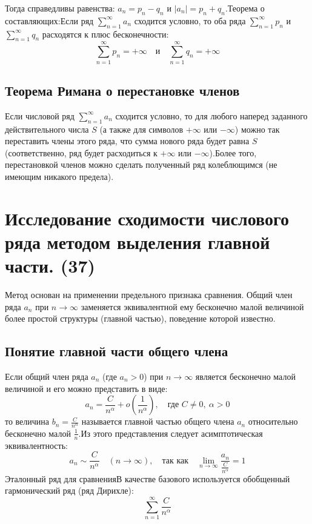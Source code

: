 \documentclass[14pt]{extreport}
\begin{document}
    Тогда справедливы равенства: $a_n = p_n - q_n$ и $|a_n| = p_n + q_n$.Теорема о составляющих:Если ряд $\sum_{n=1}^{\infty} a_n$ сходится условно, то оба ряда $\sum_{n=1}^{\infty} p_n$ и $\sum_{n=1}^{\infty} q_n$ расходятся к плюс бесконечности:$$\sum_{n=1}^{\infty} p_n = +\infty \quad \text{и} \quad \sum_{n=1}^{\infty} q_n = +\infty$$


    \section{Теорема Римана о перестановке членов}
    \begin{theorem}
        Если числовой ряд $\sum_{n=1}^{\infty} a_n$ сходится условно, то для любого наперед заданного действительного числа $S$ (а также для символов $+\infty$ или $-\infty$) можно так переставить члены этого ряда, что сумма нового ряда будет равна $S$ (соответственно, ряд будет расходиться к $+\infty$ или $-\infty$).Более того, перестановкой членов можно сделать полученный ряд колеблющимся (не имеющим никакого предела).
    \end{theorem}


    \chapter{Исследование сходимости числового ряда методом выделения главной части. (37)}

    Метод основан на применении предельного признака сравнения. Общий член ряда $a_n$ при $n \to \infty$ заменяется эквивалентной ему бесконечно малой величиной более простой структуры (главной частью), поведение которой известно.

    \section{Понятие главной части общего члена}
    Если общий член ряда $a_n$ (где $a_n > 0$) при $n \to \infty$ является бесконечно малой величиной и его можно представить в виде:$$a_n = \frac{C}{n^\alpha} + o\left(\frac{1}{n^\alpha}\right), \quad \text{где } C \neq 0, \ \alpha > 0$$то величина $b_n = \frac{C}{n^\alpha}$ называется главной частью общего члена $a_n$ относительно бесконечно малой $\frac{1}{n}$.Из этого представления следует асимптотическая эквивалентность:$$a_n \sim \frac{C}{n^\alpha} \quad (n \to \infty), \quad \text{так как} \quad \lim_{n \to \infty} \frac{a_n}{\frac{C}{n^\alpha}} = 1$$Эталонный ряд для сравненияВ качестве базового используется обобщенный гармонический ряд (ряд Дирихле):$$\sum_{n=1}^{\infty} \frac{C}{n^\alpha}$$
\end{document}
